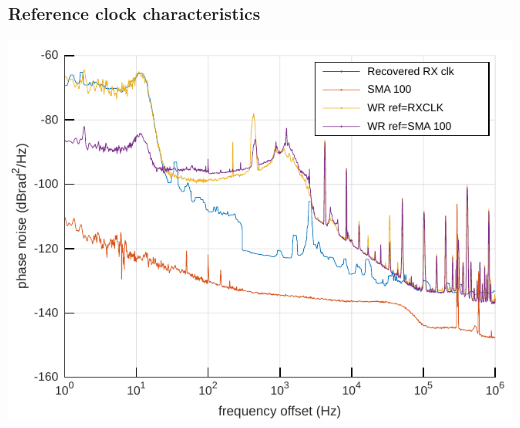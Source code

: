 \documentclass[compress,10pt,aspectratio=169]{beamer}
\begin{document}
\begin{frame}[fragile]\frametitle{Reference clock characteristics}

\begin{minipage}[t]{\linewidth}
\begin{minipage}{.49\linewidth}
\end{minipage}
\begin{minipage}{.49\linewidth}
\includegraphics[width=\linewidth]{phase_noise.pdf}
\end{minipage}
\end{minipage}
\end{frame}
\end{document}
